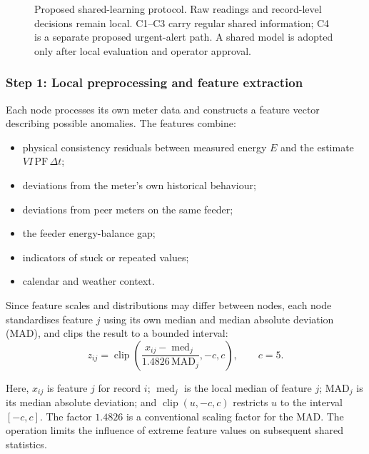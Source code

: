\documentclass[11pt,a4paper]{article}
\begin{document}
\begin{figure}[H]
{%
}
\caption{Proposed shared-learning protocol. Raw readings and
record-level decisions remain local. C1--C3 carry regular shared
information; C4 is a separate proposed urgent-alert path. A shared
model is adopted only after local evaluation and operator approval.}
\label{fig:protocol-pipeline}
\end{figure}

\subsubsection{Step 1: Local preprocessing and feature extraction}

Each node processes its own meter data and constructs a feature vector
describing possible anomalies. The features combine:
\begin{itemize}
    \item physical consistency residuals between measured energy
    $E$ and the estimate $VI\,\mathrm{PF}\,\Delta t$;
    \item deviations from the meter's own historical behaviour;
    \item deviations from peer meters on the same feeder;
    \item the feeder energy-balance gap;
    \item indicators of stuck or repeated values;
    \item calendar and weather context.
\end{itemize}

Since feature scales and distributions may differ between nodes, each
node standardises feature $j$ using its own median and median absolute
deviation (MAD), and clips the result to a bounded interval:
\begin{equation}
z_{ij} =
\operatorname{clip}\!\left(
\frac{x_{ij}-\operatorname{med}_j}
     {1.4826\,\mathrm{MAD}_j},
-c,c
\right),
\qquad c=5.
\label{eq:protocol-preprocessing}
\end{equation}

Here, $x_{ij}$ is feature $j$ for record $i$;
$\operatorname{med}_j$ is the local median of feature $j$;
$\mathrm{MAD}_j$ is its median absolute deviation; and
$\operatorname{clip}(u,-c,c)$ restricts $u$ to the interval
$[-c,c]$. The factor $1.4826$ is a conventional scaling factor for
the MAD. The operation limits the influence of extreme feature values
on subsequent shared statistics.
\end{document}
